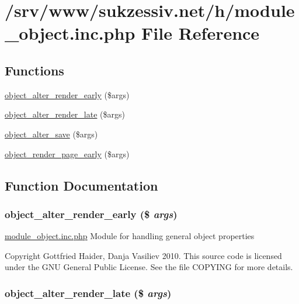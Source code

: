 \hypertarget{module__object_8inc_8php}{
\section{/srv/www/sukzessiv.net/h/module\_\-object.inc.php File Reference}
\label{module__object_8inc_8php}
}
\subsection*{Functions}
\begin{CompactItemize}
\item 
\hyperlink{module__object_8inc_8php_6acc3273ff9872e01527162375d318d8}{object\_\-alter\_\-render\_\-early} (\$args)
\item 
\hyperlink{module__object_8inc_8php_6b5bf16a15b7d5809bd7c6d15cd05a52}{object\_\-alter\_\-render\_\-late} (\$args)
\item 
\hyperlink{module__object_8inc_8php_ba3a00b339dc7e9831b48a94f4f8e211}{object\_\-alter\_\-save} (\$args)
\item 
\hyperlink{module__object_8inc_8php_d06c13f1778d655f4a011d1763c6e618}{object\_\-render\_\-page\_\-early} (\$args)
\end{CompactItemize}


\subsection{Function Documentation}
\hypertarget{module__object_8inc_8php_6acc3273ff9872e01527162375d318d8}{
\subsubsection[{object\_\-alter\_\-render\_\-early}]{\setlength{\rightskip}{0pt plus 5cm}object\_\-alter\_\-render\_\-early (\$ {\em args})}}
\label{module__object_8inc_8php_6acc3273ff9872e01527162375d318d8}


\hyperlink{module__object_8inc_8php}{module\_\-object.inc.php} Module for handling general object properties

Copyright Gottfried Haider, Danja Vasiliev 2010. This source code is licensed under the GNU General Public License. See the file COPYING for more details. \hypertarget{module__object_8inc_8php_6b5bf16a15b7d5809bd7c6d15cd05a52}{
\subsubsection[{object\_\-alter\_\-render\_\-late}]{\setlength{\rightskip}{0pt plus 5cm}object\_\-alter\_\-render\_\-late (\$ {\em args})}}
\label{module__object_8inc_8php_6b5bf16a15b7d5809bd7c6d15cd05a52}


